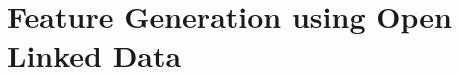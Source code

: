 \documentclass[twoside,11pt]{article}
\theoremstyle{definition}
\begin{document}
\section{Feature Generation using Open Linked Data}





\end{document}
